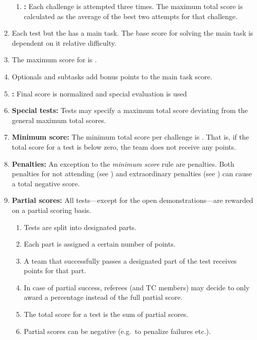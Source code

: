\begin{enumerate}
	\begin{enumerate}
		\item \textbf{:} Each challenge is attempted three times. The maximum total score is calculated as the average of the best two attempts for that challenge.
	\end{enumerate}

	\item Each test but the  has a main task. The base score for solving the main task is dependent on it relative difficulty. 
	\item The maximum score for  is .
	\item Optionals and subtasks add bonus points to the main task score.

	\item \textbf{:} Final score is normalized and special evaluation is used

	\item \textbf{Special tests:} Tests may specify a maximum total score deviating from the general maximum total scores.

	\item \textbf{Minimum score:} The minimum total score per challenge is . That is, if the total score for a test is below zero, the team does not receive any points.

	\item \textbf{Penalties:} An exception to the \emph{minimum score} rule are penalties. Both penalties for not attending (see ) and extraordinary penalties (see ) can cause a total negative score. 

	\item \textbf{Partial scores:} All tests---except for the open demonstrations---are rewarded on a partial scoring basis. 
	\begin{enumerate}
		\item Tests are split into designated parts.
		\item Each part is assigned a certain number of points.
		\item A team that successfully passes a designated part of the test receives points for that part.
		\item In case of partial success, referees (and TC members) may decide to only award a percentage instead of the full partial score.  
		\item The total score for a test is the sum of partial scores.
		\item Partial scores can be negative (e.g.~to penalize failures etc.).
	\end{enumerate}
\end{enumerate}



